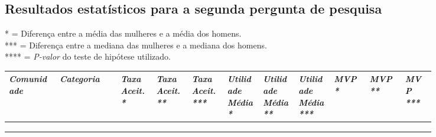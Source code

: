\begin{landscape}

\chapter{Resultados estatísticos para a segunda pergunta de pesquisa}
\label{app:q2}
\small
* = Diferença entre a média das mulheres e a média dos homens. \\
*** = Diferença entre a mediana das mulheres e a mediana dos homens. \\
**** = \textit{P-valor} do teste de hipótese utilizado. 

\begin{longtabu}{@{}
	p{0.1\linewidth}
	p{0.12\linewidth}
	P{0.07\linewidth}
	P{0.07\linewidth}
	P{0.07\linewidth}
	P{0.07\linewidth}
	P{0.07\linewidth}
	P{0.07\linewidth}
	P{0.07\linewidth}
	P{0.07\linewidth}
	p{0.06\linewidth}@{}}
\toprule
\textit{Comunidade}  & \textit{Categoria}  & \textit{Taxa Aceit. *} & \textit{Taxa Aceit. **} & \textit{Taxa Aceit. ***} & \textit{Utilidade Média *} & \textit{Utilidade Média **} & \textit{Utilidade Média *** }& \textit{MVP * }& \textit{MVP **} & \textit{MVP ***} \\ \midrule
\endhead

\\ \hline
\endfoot

\\
\endlastfoot


\end{longtabu}
\end{landscape}
